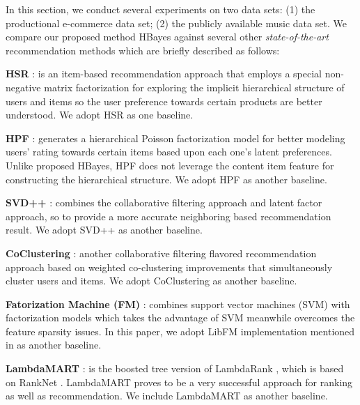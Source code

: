 In this section, we conduct several experiments on two data sets: (1) the productional e-commerce data set; (2) the publicly available music data set.  We compare our proposed method HBayes against several other \emph{state-of-the-art} recommendation methods which are briefly described as follows:

\textbf{HSR} \cite{wang2015exploring}: is an item-based recommendation approach that employs a special non-negative matrix factorization for exploring the implicit hierarchical structure of users and items so the user preference towards certain products are better understood.  We adopt HSR  as one baseline. 

\textbf{HPF} \cite{gopalan2015scalable}: generates a hierarchical Poisson factorization model for better modeling users' rating towards certain items based upon each one's latent preferences.  Unlike proposed HBayes, HPF does not leverage the content item feature for constructing the hierarchical structure. We adopt HPF as another baseline.

\textbf{SVD++} \cite{mnih2008probabilistic, koren2008factorization}: combines the collaborative filtering approach and latent factor approach, so to provide a more accurate neighboring based recommendation result.  We adopt SVD++ as another baseline.

\textbf{CoClustering} \cite{george2005scalable}: another collaborative filtering flavored recommendation approach based on weighted co-clustering improvements that simultaneously cluster users and items.  We adopt CoClustering as another baseline.

\textbf{Fatorization Machine (FM)} \cite{rendle2010factorization}: combines support vector machines (SVM) with factorization models which takes the advantage of SVM meanwhile overcomes the feature sparsity issues.  In this paper, we adopt LibFM implementation mentioned in \cite{rendle2012factorization} as another baseline.

\textbf{LambdaMART} \cite{burges2010ranknet}: is the boosted tree version of LambdaRank \cite{donmez2009local}, which is based on RankNet \cite{burges2005learning}.  LambdaMART proves to be a very successful approach for ranking as well as recommendation.  We include LambdaMART as another baseline. 

